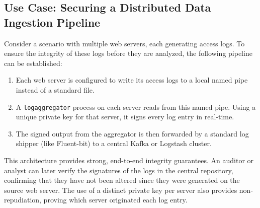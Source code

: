 \documentclass[12pt, letterpaper]{article}
\begin{document}
\subsection{Use Case: Securing a Distributed Data Ingestion Pipeline}
Consider a scenario with multiple web servers, each generating access logs. To ensure the integrity of these logs before they are analyzed, the following pipeline can be established:
\begin{enumerate}
	\item Each web server is configured to write its access logs to a local named pipe instead of a standard file.
	\item A \texttt{logaggregator} process on each server reads from this named pipe. Using a unique private key for that server, it signs every log entry in real-time.
	\item The signed output from the aggregator is then forwarded by a standard log shipper (like Fluent-bit) to a central Kafka or Logstash cluster.
\end{enumerate}
This architecture provides strong, end-to-end integrity guarantees. An auditor or analyst can later verify the signatures of the logs in the central repository, confirming that they have not been altered since they were generated on the source web server. The use of a distinct private key per server also provides non-repudiation, proving which server originated each log entry.
\end{document}
